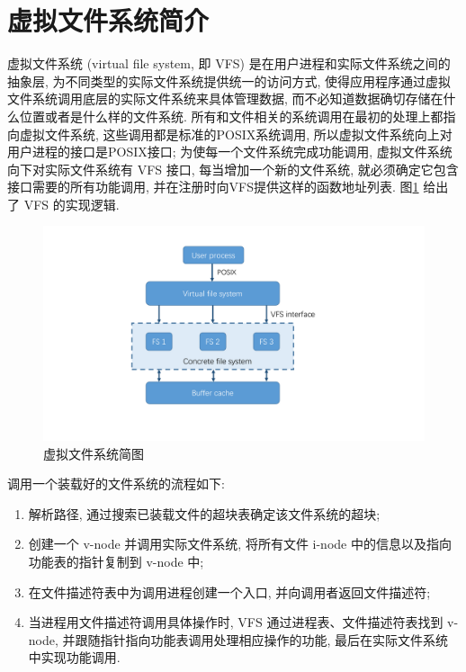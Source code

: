 \documentclass[11pt,fleqn]{book} %
\begin{document}
\newpage{}


\section{虚拟文件系统简介}



虚拟文件系统 (virtual file system, 即 VFS) 是在用户进程和实际文件系统之间的抽象层, 为不同类型的实际文件系统提供统一的访问方式,
使得应用程序通过虚拟文件系统调用底层的实际文件系统来具体管理数据, 而不必知道数据确切存储在什么位置或者是什么样的文件系统. 所有和文件相关的系统调用在最初的处理上都指向虚拟文件系统,
这些调用都是标准的POSIX系统调用, 所以虚拟文件系统向上对用户进程的接口是POSIX接口; 为使每一个文件系统完成功能调用, 虚拟文件系统向下对实际文件系统有
VFS 接口, 每当增加一个新的文件系统, 就必须确定它包含接口需要的所有功能调用, 并在注册时向VFS提供这样的函数地址列表. 图\ref{fig:=00865A=0062DF=006587=004EF6=007CFB=007EDF=007B80=0056FE}
给出了 VFS 的实现逻辑.

\begin{figure}[H]
\begin{centering}
\includegraphics[width=0.4\paperwidth]{image/vfs}
\par\end{centering}

\caption{虚拟文件系统简图\label{fig:=00865A=0062DF=006587=004EF6=007CFB=007EDF=007B80=0056FE}}


\end{figure}


调用一个装载好的文件系统的流程如下:
\begin{enumerate}
\item 解析路径, 通过搜索已装载文件的超块表确定该文件系统的超块;
\item 创建一个 v-node 并调用实际文件系统, 将所有文件 i-node 中的信息以及指向功能表的指针复制到 v-node 中;
\item 在文件描述符表中为调用进程创建一个入口, 并向调用者返回文件描述符;
\item 当进程用文件描述符调用具体操作时, VFS 通过进程表、文件描述符表找到 v-node, 并跟随指针指向功能表调用处理相应操作的功能,
最后在实际文件系统中实现功能调用. 
\end{enumerate}
\end{document}
